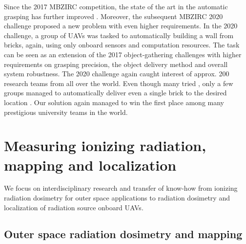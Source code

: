 \documentclass[a4paper,11pt,titlepage,twoside]{book}
\begin{document}
Since the 2017 \ac{MBZIRC} competition, the state of the art in the automatic grasping has further improved \cite{ruggiero2018aerial, feng2020packages}.
Moreover, the subsequent \ac{MBZIRC} 2020 challenge proposed a new problem with even higher requirements.
In the 2020 challenge, a group of \acp{UAV} was tasked to automatically building a wall from bricks, again, using only onboard sensors and computation resources.
The task can be seen as an extension of the 2017 object-gathering challenges with higher requirements on grasping precision, the object delivery method and overall system robustness.
The 2020 challenge again caught interest of approx. 200 research teams from all over the world.
Even though many tried \cite{lenz2020autonomous, ankit2020multi}, only a few groups managed to automatically deliver even a single brick to the desired location \cite{baca2020autonomous, lenz2020autonomous, krizmancic2020cooperative}.
Our solution \cite{baca2020autonomous, baca2020mrs} again managed to win the first place among many prestigious university teams in the world.



\section{Measuring ionizing radiation, mapping and localization}

We focus on interdisciplinary research and transfer of know-how from ionizing radiation dosimetry for outer space applications to radiation dosimetry and localization of radiation source onboard \aclp{UAV}.


\subsection{Outer space radiation dosimetry and mapping}
\end{document}
